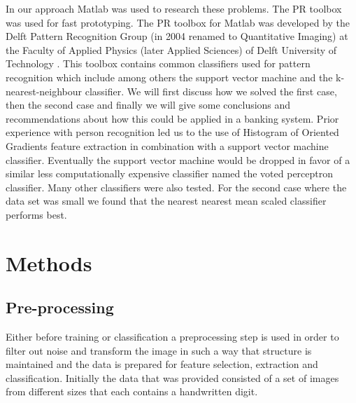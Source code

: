 \documentclass[%
        compressed,
        final,
        notitlepage,
        narroweqnarray,
        inline,
        twoside,
        ]{ieee}
\begin{document}
In our approach Matlab was used to research these problems. The PR toolbox was
used for fast prototyping. The PR toolbox for Matlab was developed by the Delft
Pattern Recognition Group (in 2004 renamed to Quantitative Imaging) at the
Faculty of Applied Physics (later Applied Sciences) of Delft University of
Technology \cite{Ferdi}.
This toolbox contains common classifiers used for pattern recognition which
include among others the support vector machine and the k-nearest-neighbour classifier. We will first
discuss how we solved the first case, then the second case and finally we will
give some conclusions and recommendations about how this could be applied in a
banking system. Prior experience with person recognition \cite{Tamis} led us to
the use of Histogram of Oriented Gradients feature
extraction in combination with a support vector machine classifier. Eventually
the support vector machine would be dropped in favor of a similar less
computationally expensive classifier named the voted perceptron classifier. Many
other classifiers were also tested. For the second case where the data set was small we found that the nearest nearest mean scaled classifier performs best.

\section{Methods}
\subsection{Pre-processing}
Either before training or classification a preprocessing step is used in order
to filter out noise and transform the image in such a way that structure is
maintained and the data is prepared for feature selection, extraction and
classification. Initially the data that was provided consisted of a set of
images from different sizes that each contains a handwritten digit.
\end{document}
